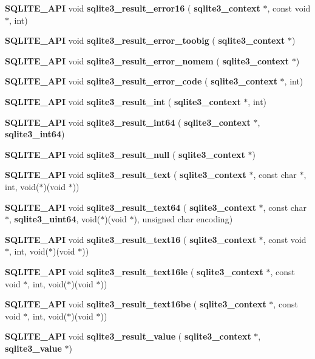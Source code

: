 \begin{DoxyCompactItemize}
\item 
\textbf{ S\+Q\+L\+I\+T\+E\+\_\+\+A\+PI} void \textbf{ sqlite3\+\_\+result\+\_\+error16} (\textbf{ sqlite3\+\_\+context} $\ast$, const void $\ast$, int)
\item 
\textbf{ S\+Q\+L\+I\+T\+E\+\_\+\+A\+PI} void \textbf{ sqlite3\+\_\+result\+\_\+error\+\_\+toobig} (\textbf{ sqlite3\+\_\+context} $\ast$)
\item 
\textbf{ S\+Q\+L\+I\+T\+E\+\_\+\+A\+PI} void \textbf{ sqlite3\+\_\+result\+\_\+error\+\_\+nomem} (\textbf{ sqlite3\+\_\+context} $\ast$)
\item 
\textbf{ S\+Q\+L\+I\+T\+E\+\_\+\+A\+PI} void \textbf{ sqlite3\+\_\+result\+\_\+error\+\_\+code} (\textbf{ sqlite3\+\_\+context} $\ast$, int)
\item 
\textbf{ S\+Q\+L\+I\+T\+E\+\_\+\+A\+PI} void \textbf{ sqlite3\+\_\+result\+\_\+int} (\textbf{ sqlite3\+\_\+context} $\ast$, int)
\item 
\textbf{ S\+Q\+L\+I\+T\+E\+\_\+\+A\+PI} void \textbf{ sqlite3\+\_\+result\+\_\+int64} (\textbf{ sqlite3\+\_\+context} $\ast$, \textbf{ sqlite3\+\_\+int64})
\item 
\textbf{ S\+Q\+L\+I\+T\+E\+\_\+\+A\+PI} void \textbf{ sqlite3\+\_\+result\+\_\+null} (\textbf{ sqlite3\+\_\+context} $\ast$)
\item 
\textbf{ S\+Q\+L\+I\+T\+E\+\_\+\+A\+PI} void \textbf{ sqlite3\+\_\+result\+\_\+text} (\textbf{ sqlite3\+\_\+context} $\ast$, const char $\ast$, int, void($\ast$)(void $\ast$))
\item 
\textbf{ S\+Q\+L\+I\+T\+E\+\_\+\+A\+PI} void \textbf{ sqlite3\+\_\+result\+\_\+text64} (\textbf{ sqlite3\+\_\+context} $\ast$, const char $\ast$, \textbf{ sqlite3\+\_\+uint64}, void($\ast$)(void $\ast$), unsigned char encoding)
\item 
\textbf{ S\+Q\+L\+I\+T\+E\+\_\+\+A\+PI} void \textbf{ sqlite3\+\_\+result\+\_\+text16} (\textbf{ sqlite3\+\_\+context} $\ast$, const void $\ast$, int, void($\ast$)(void $\ast$))
\item 
\textbf{ S\+Q\+L\+I\+T\+E\+\_\+\+A\+PI} void \textbf{ sqlite3\+\_\+result\+\_\+text16le} (\textbf{ sqlite3\+\_\+context} $\ast$, const void $\ast$, int, void($\ast$)(void $\ast$))
\item 
\textbf{ S\+Q\+L\+I\+T\+E\+\_\+\+A\+PI} void \textbf{ sqlite3\+\_\+result\+\_\+text16be} (\textbf{ sqlite3\+\_\+context} $\ast$, const void $\ast$, int, void($\ast$)(void $\ast$))
\item 
\textbf{ S\+Q\+L\+I\+T\+E\+\_\+\+A\+PI} void \textbf{ sqlite3\+\_\+result\+\_\+value} (\textbf{ sqlite3\+\_\+context} $\ast$, \textbf{ sqlite3\+\_\+value} $\ast$)

\end{DoxyCompactItemize}
